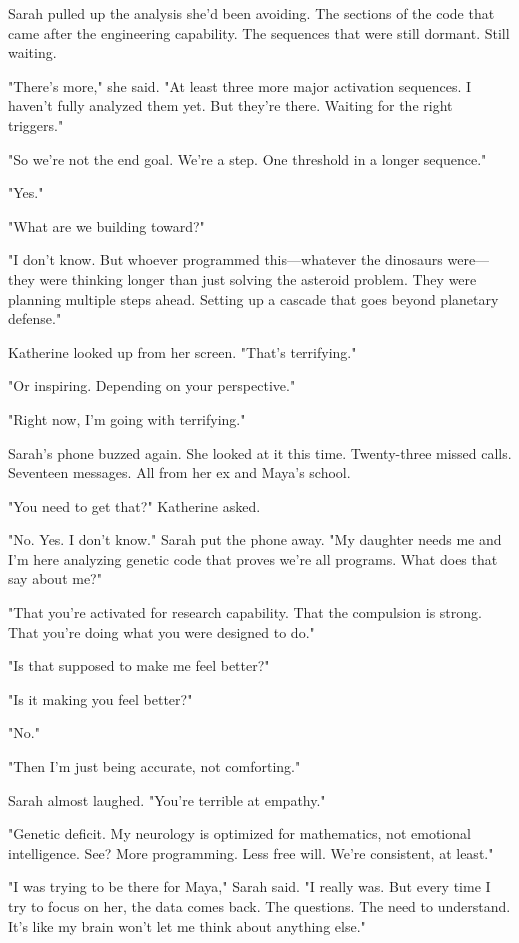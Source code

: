 Sarah pulled up the analysis she'd been avoiding. The sections of the code that came after the engineering capability. The sequences that were still dormant. Still waiting.

"There's more," she said. "At least three more major activation sequences. I haven't fully analyzed them yet. But they're there. Waiting for the right triggers."

"So we're not the end goal. We're a step. One threshold in a longer sequence."

"Yes."

"What are we building toward?"

"I don't know. But whoever programmed this—whatever the dinosaurs were—they were thinking longer than just solving the asteroid problem. They were planning multiple steps ahead. Setting up a cascade that goes beyond planetary defense."

Katherine looked up from her screen. "That's terrifying."

"Or inspiring. Depending on your perspective."

"Right now, I'm going with terrifying."

Sarah's phone buzzed again. She looked at it this time. Twenty-three missed calls. Seventeen messages. All from her ex and Maya's school.

"You need to get that?" Katherine asked.

"No. Yes. I don't know." Sarah put the phone away. "My daughter needs me and I'm here analyzing genetic code that proves we're all programs. What does that say about me?"

"That you're activated for research capability. That the compulsion is strong. That you're doing what you were designed to do."

"Is that supposed to make me feel better?"

"Is it making you feel better?"

"No."

"Then I'm just being accurate, not comforting."

Sarah almost laughed. "You're terrible at empathy."

"Genetic deficit. My neurology is optimized for mathematics, not emotional intelligence. See? More programming. Less free will. We're consistent, at least."

"I was trying to be there for Maya," Sarah said. "I really was. But every time I try to focus on her, the data comes back. The questions. The need to understand. It's like my brain won't let me think about anything else."


